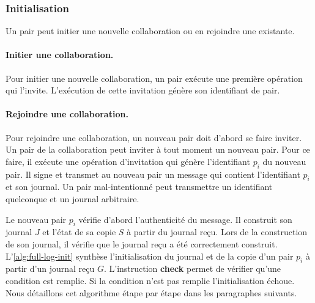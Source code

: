 \subsubsection{Initialisation}

Un pair peut initier une nouvelle collaboration ou en rejoindre une existante.

\paragraph{Initier une collaboration.}
Pour initier une nouvelle collaboration, un pair exécute une première opération qui l'invite.
L'exécution de cette invitation génère son identifiant de pair.


\paragraph{Rejoindre une collaboration.}
Pour rejoindre une collaboration, un nouveau pair doit d'abord se faire inviter.
Un pair de la collaboration peut inviter à tout moment un nouveau pair.
Pour ce faire, il exécute une opération d'invitation qui génère l'identifiant $p_i$ du nouveau pair.
Il signe et transmet au nouveau pair un message qui contient l'identifiant $p_i$ et son journal.
Un pair mal-intentionné peut transmettre un identifiant quelconque et un journal arbitraire.

Le nouveau pair $p_i$ vérifie d'abord l'authenticité du message.
Il construit son journal $J$ et l'état de sa copie $S$ à partir du journal reçu.
Lors de la construction de son journal, il vérifie que le journal reçu a été correctement construit.
L'\autoref{alg:full-log-init} synthèse l'initialisation du journal et de la copie d'un pair $p_i$ à partir d'un journal reçu $G$.
L'instruction \textbf{check} permet de vérifier qu'une condition est remplie.
Si la condition n'est pas remplie l'initialisation échoue.
Nous détaillons cet algorithme étape par étape dans les paragraphes suivants.

